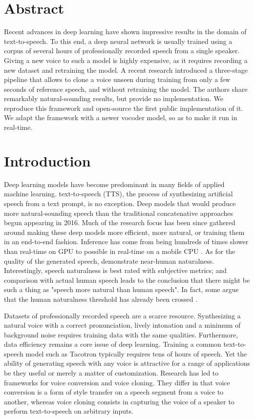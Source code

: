 \documentclass[a4paper, oneside, 12pt, english]{article}
\begin{document}
\section*{Abstract}
Recent advances in deep learning have shown impressive results in the domain of text-to-speech. To this end, a deep neural network is usually trained using a corpus of several hours of professionally recorded speech from a single speaker. Giving a new voice to such a model is highly expensive, as it requires recording a new dataset and retraining the model. A recent research introduced a three-stage pipeline that allows to clone a voice unseen during training from only a few seconds of reference speech, and without retraining the model. The authors share remarkably natural-sounding results, but provide no implementation. We reproduce this framework and open-source the first public implementation of it. We adapt the framework with a newer vocoder model, so as to make it run in real-time.
\clearpage

\tableofcontents
\clearpage

\section{Introduction}
Deep learning models have become predominant in many fields of applied machine learning. text-to-speech (TTS), the process of synthesizing artificial speech from a text prompt, is no exception. Deep models that would produce more natural-sounding speech than the traditional concatenative approaches begun appearing in 2016. Much of the research focus has been since gathered around making these deep models more efficient, more natural, or training them in an end-to-end fashion. Inference has come from being hundreds of times slower than real-time on GPU \citep{WaveNet} to possible in real-time on a mobile CPU \citep{WaveRNN}. As for the quality of the generated speech, \citet{Tacotron2} demonstrate near-human naturalness. Interestingly, speech naturalness is best rated with subjective metrics; and comparison with actual human speech leads to the conclusion that there might be such a thing as "speech more natural than human speech". In fact, some argue that the human naturalness threshold has already been crossed \citep{MOSNaturalness}.

Datasets of professionally recorded speech are a scarce resource. Synthesizing a natural voice with a correct pronunciation, lively intonation and a minimum of background noise requires training data with the same qualities. Furthermore, data efficiency remains a core issue of deep learning. Training a common text-to-speech model such as Tacotron \citep{Tacotron1} typically requires tens of hours of speech. Yet the ability of generating speech with any voice is attractive for a range of applications be they useful or merely a matter of customization. Research has led to frameworks for voice conversion and voice cloning. They differ in that voice conversion is a form of style transfer on a speech segment from a voice to another, whereas voice cloning consists in capturing the voice of a speaker to perform text-to-speech on arbitrary inputs. 
\end{document}
